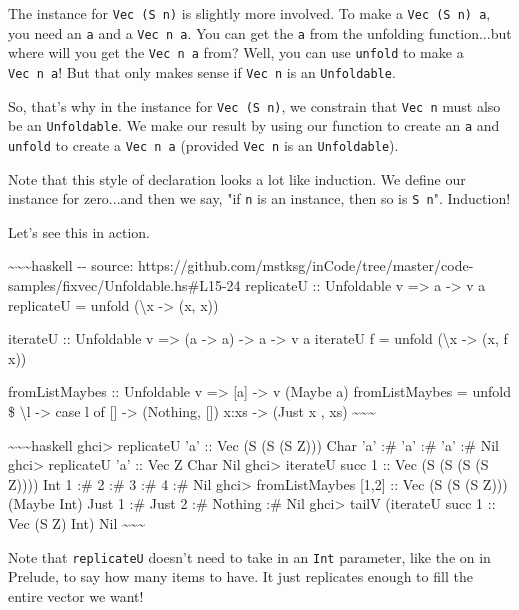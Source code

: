 \documentclass[]{article}
\begin{document}
The instance for \texttt{Vec\ (S\ n)} is slightly more involved. To make a
\texttt{Vec\ (S\ n)\ a}, you need an \texttt{a} and a \texttt{Vec\ n\ a}. You
can get the \texttt{a} from the unfolding function...but where will you get the
\texttt{Vec\ n\ a} from? Well, you can use \texttt{unfold} to make a
\texttt{Vec\ n\ a}! But that only makes sense if \texttt{Vec\ n} is an
\texttt{Unfoldable}.

So, that's why in the instance for \texttt{Vec\ (S\ n)}, we constrain that
\texttt{Vec\ n} must also be an \texttt{Unfoldable}. We make our result by using
our function to create an \texttt{a} and \texttt{unfold} to create a
\texttt{Vec\ n\ a} (provided \texttt{Vec\ n} is an \texttt{Unfoldable}).

Note that this style of declaration looks a lot like induction. We define our
instance for zero...and then we say, "if \texttt{n} is an instance, then so is
\texttt{S\ n}". Induction!

Let's see this in action.

\textasciitilde{}\textasciitilde{}\textasciitilde{}haskell -\/- source:
https://github.com/mstksg/inCode/tree/master/code-samples/fixvec/Unfoldable.hs\#L15-24
replicateU :: Unfoldable v =\textgreater{} a -\textgreater{} v a replicateU =
unfold (\textbackslash{}x -\textgreater{} (x, x))

iterateU :: Unfoldable v =\textgreater{} (a -\textgreater{} a) -\textgreater{} a
-\textgreater{} v a iterateU f = unfold (\textbackslash{}x -\textgreater{} (x, f
x))

fromListMaybes :: Unfoldable v =\textgreater{} {[}a{]} -\textgreater{} v (Maybe
a) fromListMaybes = unfold \$ \textbackslash{}l -\textgreater{} case l of {[}{]}
-\textgreater{} (Nothing, {[}{]}) x:xs -\textgreater{} (Just x , xs)
\textasciitilde{}\textasciitilde{}\textasciitilde{}

\textasciitilde{}\textasciitilde{}\textasciitilde{}haskell ghci\textgreater{}
replicateU 'a' :: Vec (S (S (S Z))) Char 'a' :\# 'a' :\# 'a' :\# Nil
ghci\textgreater{} replicateU 'a' :: Vec Z Char Nil ghci\textgreater{} iterateU
succ 1 :: Vec (S (S (S (S Z)))) Int 1 :\# 2 :\# 3 :\# 4 :\# Nil
ghci\textgreater{} fromListMaybes {[}1,2{]} :: Vec (S (S (S Z))) (Maybe Int)
Just 1 :\# Just 2 :\# Nothing :\# Nil ghci\textgreater{} tailV (iterateU succ 1
:: Vec (S Z) Int) Nil \textasciitilde{}\textasciitilde{}\textasciitilde{}

Note that \texttt{replicateU} doesn't need to take in an \texttt{Int} parameter,
like the on in Prelude, to say how many items to have. It just replicates enough
to fill the entire vector we want!
\end{document}
